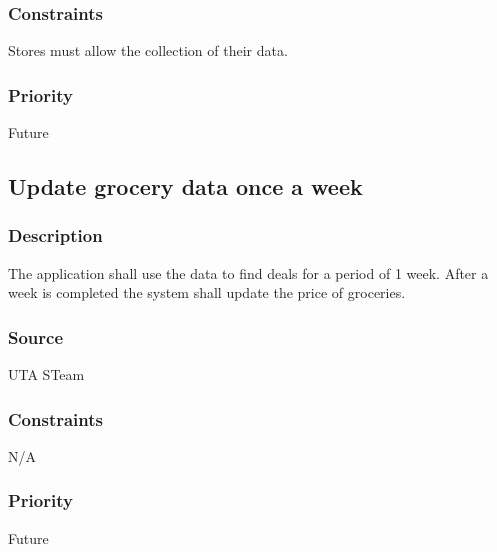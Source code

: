 \subsubsection{Constraints}
Stores must allow the collection of their data.
\subsubsection{Priority}
Future

\subsection{Update grocery data once a week}
\subsubsection{Description}
The application shall use the data to find deals for a period of 1 week. After a week is completed the system shall update the price of groceries.  
\subsubsection{Source}
UTA STeam
\subsubsection{Constraints}
N/A
\subsubsection{Priority}
Future